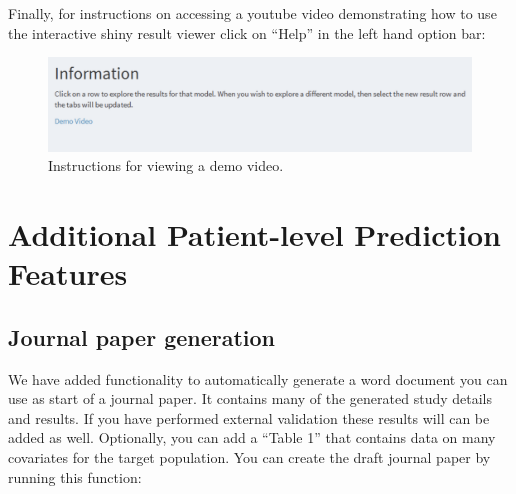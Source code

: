 \documentclass[11pt]{book}
\theoremstyle{definition}
\theoremstyle{definition}
\theoremstyle{definition}
\theoremstyle{remark}
\begin{document}
Finally, for instructions on accessing a youtube video demonstrating how to use the interactive shiny result viewer click on ``Help'' in the left hand option bar:

\begin{figure}

{\centering \includegraphics[width=0.8\linewidth]{images/PatientLevelPrediction/shiny/shinyHelp} 

}

\caption{Instructions for viewing a demo video.}\label{fig:shinyHelp}
\end{figure}

\newpage

\hypertarget{additional-patient-level-prediction-features}{%
\section{Additional Patient-level Prediction Features}\label{additional-patient-level-prediction-features}}

\hypertarget{journal-paper-generation}{%
\subsection{Journal paper generation}\label{journal-paper-generation}}

We have added functionality to automatically generate a word document you can use as start of a journal paper. It contains many of the generated study details and results. If you have performed external validation these results will can be added as well. Optionally, you can add a ``Table 1'' that contains data on many covariates for the target population. You can create the draft journal paper by running this function:
\end{document}
